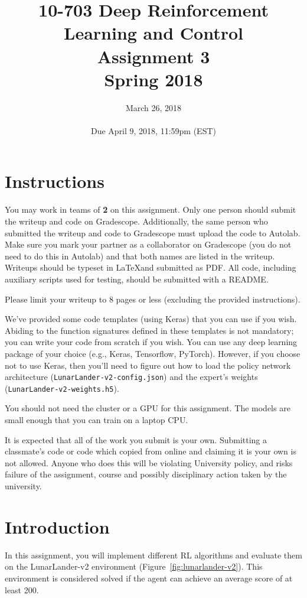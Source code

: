 \documentclass[12pt]{article}
\title{10-703 Deep Reinforcement Learning and Control\\
  Assignment 3\\
  Spring 2018
}
\date{March 26, 2018\\
  \hspace{1cm}\\
Due April 9, 2018, 11:59pm (EST)}
\begin{document}
\maketitle

\section*{Instructions}

You may work in teams of \textbf{2} on this assignment. Only one person should submit the writeup and code on Gradescope. Additionally, the same person who submitted the writeup and code to Gradescope must upload the code to Autolab.  Make sure you mark your partner as a collaborator on Gradescope (you do not need to do this in Autolab) and that both names are listed in the writeup.  Writeups should be typeset in \LaTeX and submitted as PDF. All code, including auxiliary scripts used for testing, should be submitted with a README.

Please limit your writeup to 8 pages or less (excluding the provided instructions).

We've provided some code templates (using Keras) that you can use if you wish. Abiding to the function signatures defined in these templates is not mandatory; you can write your code from scratch if you wish. You can use any deep learning package of your choice (e.g., Keras, Tensorflow, PyTorch). However, if you choose not to use Keras, then you'll need to figure out how to load the policy network architecture (\texttt{LunarLander-v2-config.json}) and the expert's weights (\texttt{LunarLander-v2-weights.h5}).

You should not need the cluster or a GPU for this assignment. The models are small enough that you can train on a laptop CPU.

It is expected that all of the work you submit is your own. Submitting a classmate's code or code which copied from online and claiming it is your own is not allowed. Anyone who does this will be violating University policy, and risks failure of the assignment, course and possibly disciplinary action taken by the university.

\section*{Introduction}

In this assignment, you will implement different RL algorithms and evaluate them on the LunarLander-v2 environment (Figure~\ref{fig:lunarlander-v2}). This environment is considered solved if the agent can achieve an average score of at least 200.
\end{document}

